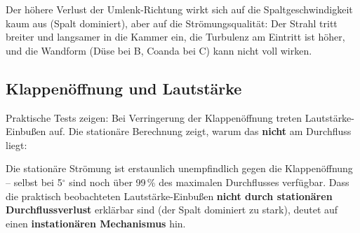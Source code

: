 \documentclass[11pt,a4paper]{article}
\begin{document}
Der höhere Verlust der Umlenk-Richtung wirkt sich auf die Spaltgeschwindigkeit kaum aus (Spalt dominiert), aber auf die Strömungsqualität: Der Strahl tritt breiter und langsamer in die Kammer ein, die Turbulenz am Eintritt ist höher, und die Wandform (Düse bei B, Coanda bei C) kann nicht voll wirken.

\subsection{Klappenöffnung und Lautstärke}

Praktische Tests zeigen: Bei Verringerung der Klappenöffnung treten Lautstärke-Einbußen auf. Die stationäre Berechnung zeigt, warum das \textbf{nicht} am Durchfluss liegt:

\begin{table}[H]
\centering\small
{}
\caption{Volumenstrom bei verschiedenen Klappenöffnungswinkeln (bei 1000\,Pa, Wand A)}
\end{table}

\begin{warnbox}
Die stationäre Strömung ist erstaunlich unempfindlich gegen die Klappenöffnung -- selbst bei 5${}^\circ$ sind noch über 99\,\% des maximalen Durchflusses verfügbar. Dass die praktisch beobachteten Lautstärke-Einbußen \textbf{nicht durch stationären Durchflussverlust} erklärbar sind (der Spalt dominiert zu stark), deutet auf einen \textbf{instationären Mechanismus} hin.
\end{warnbox}
\end{document}
